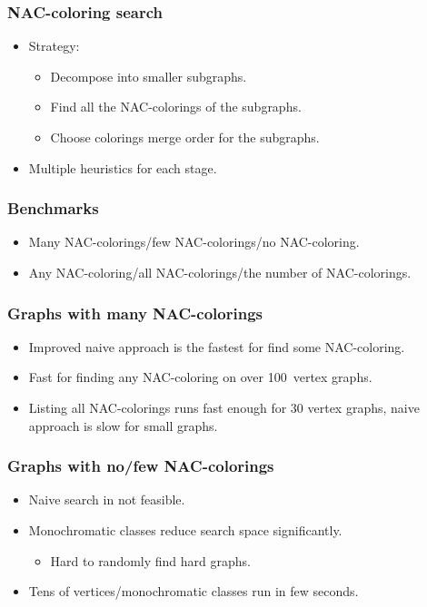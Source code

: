 \documentclass[aspectratio=\myaspectratio]{beamer}
\begin{document}
\begin{frame}
	\frametitle{NAC-coloring search}
	\begin{itemize}
		\item
		      Strategy:
		      \begin{itemize}
			      \item
			            Decompose into smaller subgraphs.
			      \item
			            Find all the NAC-colorings of the subgraphs.
			      \item
			            Choose colorings merge order for the subgraphs.
		      \end{itemize}
		\item
		      Multiple heuristics for each stage.
	\end{itemize}
\end{frame}

\begin{frame}
	\frametitle{Benchmarks}
	\begin{itemize}
		\item
		      Many NAC-colorings/few NAC-colorings/no NAC-coloring.
		\item
		      Any NAC-coloring/all NAC-colorings/the number of NAC-colorings.
	\end{itemize}
\end{frame}

\begin{frame}
	\frametitle{Graphs with many NAC-colorings}
	\begin{itemize}
		\item
		      Improved naive approach is the fastest for find some NAC-coloring.
		\item
		      Fast for finding any NAC-coloring on over 100 vertex graphs.
		\item
		      Listing all NAC-colorings runs fast enough for 30 vertex graphs,
		      naive approach is slow for small graphs.
	\end{itemize}
\end{frame}

\begin{frame}
	\frametitle{Graphs with no/few NAC-colorings}
	\begin{itemize}
		\item
		      Naive search in not feasible.
		\item
		      Monochromatic classes reduce search space significantly.
		      \begin{itemize}
			      \item Hard to randomly find hard graphs.
		      \end{itemize}
		\item
		      Tens of vertices/monochromatic classes run in few seconds.
	\end{itemize}
\end{frame}
\end{document}

